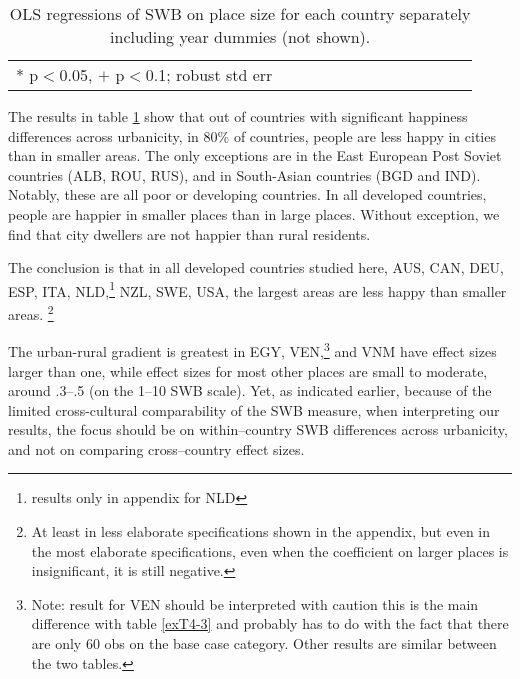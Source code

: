 \documentclass[10pt, letterpaper]{article}
\begin{document}
\begin{spacing}{.9} \begin{table}[H]\centering   \begin{scriptsize} \begin{tabular}{p{.5in}p{.5in}p{.5in}p{.5in}p{.5in}p{.5in}p{.5in}p{.5in}p{.5in}p{.5in}p{.5 in}p{.5in}p{.5 in}}\hline  \hline * p$<$0.05, $+$ p$<$0.1; robust std err \end{tabular}\end{scriptsize}\caption{\label{d1}OLS regressions of SWB on place size for each country separately including year
dummies (not shown).}\end{table} \end{spacing}


The results in table \ref{d1} %
show that out of countries with significant happiness differences across
urbanicity, in 80\% of countries, people are less happy in cities than in
smaller areas. The only exceptions are in the East European Post Soviet countries (ALB, ROU, RUS), and in South-Asian countries (BGD and IND). Notably, these are all poor or developing
countries. In all developed countries, people are happier in smaller places than in large places. Without exception, we find that city dwellers are not happier than rural residents. 

%
The conclusion is that in all developed countries studied here, AUS, CAN, DEU, ESP, ITA,
NLD,\footnote{results only in appendix for NLD} NZL, SWE, USA,  the largest areas
are less happy than smaller areas. \footnote{At least in less elaborate specifications shown in the appendix, but even in the most elaborate specifications, even when the coefficient on larger places is insignificant, it is still negative.}

The urban-rural gradient is greatest in EGY, VEN,\footnote{Note: result for VEN should be interpreted with caution this is the main difference with table \ref{exT4-3} and probably has to do with the fact that there are only 60 obs on the base case category. Other results are
  similar between the two tables.} and VNM have effect sizes larger than one, while effect sizes for most other places are small to moderate, around .3--.5 (on the 1--10 SWB scale).   
Yet, as indicated earlier, because of the limited cross-cultural comparability of the SWB measure, when interpreting our results, the focus should be on within--country SWB differences across urbanicity, and not on comparing cross--country effect sizes.
\end{document}
